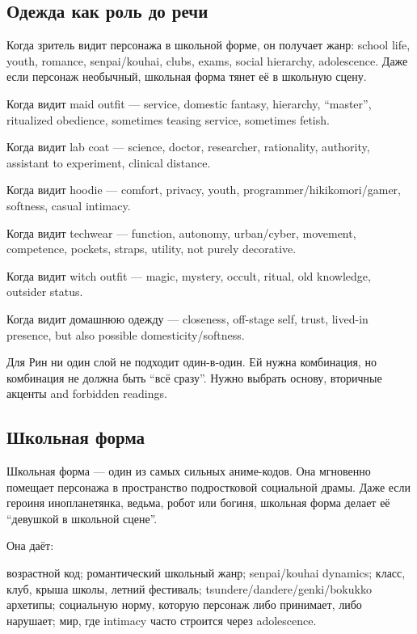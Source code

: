 \subsection*{Одежда как роль до речи}

Когда зритель видит персонажа в школьной форме, он получает жанр: school
life, youth, romance, senpai/\hspace{0pt}kouhai, clubs, exams, social hierarchy,
adolescence. Даже если персонаж необычный, школьная форма тянет её в
школьную сцену.

Когда видит maid outfit --- service, domestic fantasy, hierarchy,
``master'', ritualized obedience, sometimes teasing service, sometimes
fetish.

Когда видит lab coat --- science, doctor, researcher, rationality,
authority, assistant to experiment, clinical distance.

Когда видит hoodie --- comfort, privacy, youth,
programmer/\hspace{0pt}hikikomori/\hspace{0pt}gamer, softness, casual intimacy.

Когда видит techwear --- function, autonomy, urban/\hspace{0pt}cyber, movement,
competence, pockets, straps, utility, not purely decorative.

Когда видит witch outfit --- magic, mystery, occult, ritual, old
knowledge, outsider status.

Когда видит домашнюю одежду --- closeness, off-stage self, trust,
lived-in presence, but also possible domesticity/\hspace{0pt}softness.

Для Рин ни один слой не подходит один-в-один. Ей нужна комбинация, но
комбинация не должна быть ``всё сразу''. Нужно выбрать основу, вторичные
акценты and forbidden readings.

\subsection*{Школьная форма}

Школьная форма --- один из самых сильных аниме-кодов. Она мгновенно
помещает персонажа в пространство подростковой социальной драмы. Даже
если героиня инопланетянка, ведьма, робот или богиня, школьная форма
делает её ``девушкой в школьной сцене''.

Она даёт:

возрастной код; романтический школьный жанр; senpai/\hspace{0pt}kouhai dynamics;
класс, клуб, крыша школы, летний фестиваль;
tsundere/\hspace{0pt}dandere/\hspace{0pt}genki/\hspace{0pt}bokukko архетипы; социальную норму, которую
персонаж либо принимает, либо нарушает; мир, где intimacy часто строится
через adolescence.

